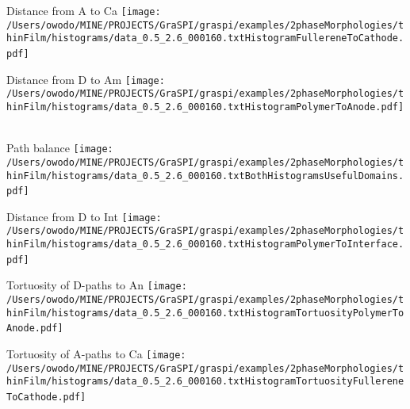 \documentclass{article}
\begin{document}
\parbox{0.60\textwidth}{
\parbox{0.3\textwidth}{\centering Distance from A to Ca \newline
\texttt{[image: /Users/owodo/MINE/PROJECTS/GraSPI/graspi/examples/2phaseMorphologies/thinFilm/histograms/data\_0.5\_2.6\_000160.txtHistogramFullereneToCathode.pdf]} \ ~ \ } 
\parbox{0.3\textwidth}{\centering Distance from D to Am \newline
\texttt{[image: /Users/owodo/MINE/PROJECTS/GraSPI/graspi/examples/2phaseMorphologies/thinFilm/histograms/data\_0.5\_2.6\_000160.txtHistogramPolymerToAnode.pdf]} \ ~ \ }
\parbox{0.3\textwidth}{\centering Path balance \newline 
\texttt{[image: /Users/owodo/MINE/PROJECTS/GraSPI/graspi/examples/2phaseMorphologies/thinFilm/histograms/data\_0.5\_2.6\_000160.txtBothHistogramsUsefulDomains.pdf]} \ ~ \ }
\parbox{0.3\textwidth}{\centering Distance from D to Int \newline 
\texttt{[image: /Users/owodo/MINE/PROJECTS/GraSPI/graspi/examples/2phaseMorphologies/thinFilm/histograms/data\_0.5\_2.6\_000160.txtHistogramPolymerToInterface.pdf]} \ ~ \ }
\parbox{0.3\textwidth}{\centering Tortuosity of D-paths to An  \newline
\texttt{[image: /Users/owodo/MINE/PROJECTS/GraSPI/graspi/examples/2phaseMorphologies/thinFilm/histograms/data\_0.5\_2.6\_000160.txtHistogramTortuosityPolymerToAnode.pdf]} \ ~ \ }
\parbox{0.3\textwidth}{\centering Tortuosity of A-paths to Ca \newline
\texttt{[image: /Users/owodo/MINE/PROJECTS/GraSPI/graspi/examples/2phaseMorphologies/thinFilm/histograms/data\_0.5\_2.6\_000160.txtHistogramTortuosityFullereneToCathode.pdf]} \ ~ \ }
}
\newpage
\end{document}
